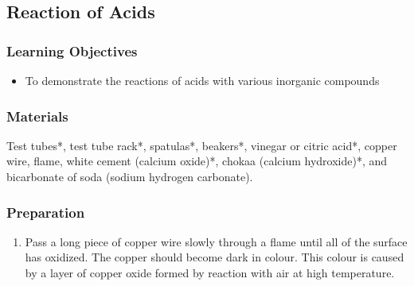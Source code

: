 \subsection{Reaction of Acids}

\subsubsection*{Learning Objectives}
\begin{itemize}
\item{To demonstrate the reactions of acids with various inorganic compounds}
\end{itemize}

\subsubsection*{Materials}
Test tubes*, test tube rack*, spatulas*, beakers*, vinegar or citric acid*, copper wire, flame, white cement (calcium oxide)*, chokaa (calcium hydroxide)*, and bicarbonate of soda (sodium hydrogen carbonate).

\subsubsection*{Preparation}
\begin{enumerate}
\item{Pass a long piece of copper wire slowly through a flame until all of the surface has oxidized. The copper should become dark in colour. This colour is caused by a layer of copper oxide formed by reaction with air at high temperature.}
\end{enumerate}

